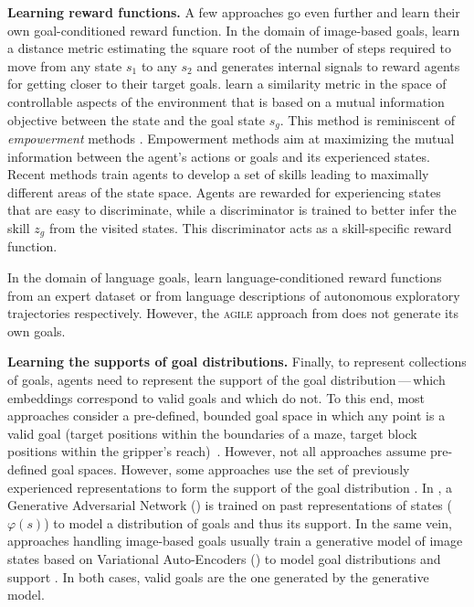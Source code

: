 \noindent\textbf{Learning reward functions.} A few approaches go even further and learn their own goal-conditioned reward function. In the domain of image-based goals, \citet{venkattaramanujam2019self,hartikainen2019dynamical} learn a distance metric estimating the square root of the number of steps required to move from any state $s_1$ to any $s_2$ and generates internal signals to reward agents for getting closer to their target goals. \citet{warde2018unsupervised} learn a similarity metric in the space of controllable aspects of the environment that is based on a mutual information objective between the state and the goal state $s_g$. This method is reminiscent of \textit{empowerment} methods \cite{mohamed_variational_2015,gregor2016variational,achiam_variational_2018,eysenbach2018diversity,dai_empowerment-based_2020,sharma_dynamics-aware_2020,choi_variational_2021}. Empowerment methods aim at maximizing the mutual information between the agent's actions or goals and its experienced states. Recent methods train agents to develop a set of skills leading to maximally different areas of the state space. Agents are rewarded for experiencing states that are easy to discriminate, while a discriminator is trained to better infer the skill $z_g$ from the visited states. This discriminator acts as a skill-specific reward function. 

In the domain of language goals, \citet{bahdanau2018learning,imagine} learn language-conditioned reward functions from an expert dataset or from language descriptions of autonomous exploratory trajectories respectively. However, the \textsc{agile} approach from \citet{bahdanau2018learning} does not generate its own goals.  

 \noindent\textbf{Learning the supports of goal distributions.} Finally, to represent collections of goals, agents need to represent the support of the goal distribution\,---\,which embeddings correspond to valid goals and which do not. To this end, most approaches consider a pre-defined, bounded goal space in which any point is a valid goal (\eg target positions within the boundaries of a maze, target block positions within the gripper's reach)~\citep{schaul2015universal,andrychowicz2017hindsight,nair2017overcoming,plappert2018multi,curious,blaes2019control,lanier2019curiosity,ding_imitation_2019,li2019towards}. However, not all approaches assume pre-defined goal spaces. However, some approaches use the set of previously experienced representations to form the support of the goal distribution \citep{veeriah2018many,akakzia2020decstr,ecoffet2020first}. In \citet{goalgan}, a Generative Adversarial Network (\gan) is trained on past representations of states ($\varphi(s)$) to model a distribution of goals and thus its support. In the same vein, approaches handling image-based goals usually train a generative model of image states based on Variational Auto-Encoders (\vae) to model goal distributions and support \citep{nair2018visual,pong2019skew,nair2020contextual}. In both cases, valid goals are the one generated by the generative model.


